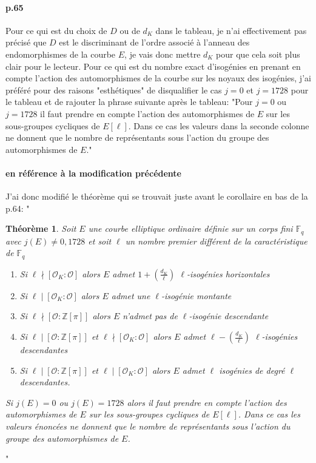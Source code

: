 \documentclass[10pt,a4paper]{article}
\theoremstyle{plain}
\newtheorem{thm}{Théorème}[section]
\theoremstyle{definition}
\theoremstyle{definition}
\theoremstyle{definition}
\theoremstyle{definition}
\theoremstyle{definition}
\theoremstyle{remark}
\theoremstyle{remark}
\theoremstyle{definition}
\begin{document}
\paragraph{p.65}{Pour ce qui est du choix de $D$ ou de $d_{K}$ dans le tableau,
je n'ai effectivement pas précisé que $D$ est le discriminant de l'ordre 
associé à l'anneau des endomorphismes de la courbe $E$, je vais donc mettre 
$d_K$ pour que cela soit plus clair pour le lecteur. Pour ce qui est du nombre 
exact d'isogénies en prenant en compte l'action des automorphismes de la 
courbe sur les noyaux des isogénies, j'ai préféré pour des raisons 
"esthétiques" de disqualifier le cas $j=0$ et $j=1728$ pour le tableau et de 
rajouter la phrase suivante après le tableau: "Pour $j=0$ ou $j=1728$ il faut 
prendre en compte l'action des automorphismes de
$E$ sur les sous-groupes cycliques de $E[\ell]$. Dans ce cas
 les valeurs dans la seconde colonne ne donnent que le nombre 
de représentants sous l'action du groupe des automorphismes de $E$."}

\paragraph{ en référence à la modification précédente}{J'ai donc modifié le théorème qui se trouvait juste avant le corollaire en bas de la p.64: "\begin{thm}
\label{thm:Koh:cas}
Soit $E$ une courbe elliptique ordinaire définie sur un corps fini 
$\mathbb{F}_q$ avec $j(E)\neq 0, 1728$ et soit $\ell$ un nombre premier 
différent de la caractéristique de $\mathbb{F}_q$
\begin{enumerate}
\item Si $\ell \nmid [\mathcal{O}_K : \mathcal{O}]$ alors $E$ admet $ 1 + \left( \frac{d_K}{\ell} \right)$ $\ell$-isogénies horizontales
\item Si $\ell \mid [\mathcal{O}_K : \mathcal{O}]$ alors $E$ admet une $\ell$-isogénie montante
\item Si $\ell \nmid [\mathcal{O} : \mathbb{Z}[\pi]]$ alors $E$ n'admet pas de $\ell$-isogénie descendante
\item Si $\ell \mid [\mathcal{O} : \mathbb{Z}[\pi]]$ et $\ell \nmid [\mathcal{O}_K : \mathcal{O}]$ alors $E$ admet $\ell-\left( \frac{d_K}{\ell} \right)$ $\ell$-isogénies descendantes
\item  Si $\ell \mid [\mathcal{O} : \mathbb{Z}[\pi]]$ et $\ell \mid [\mathcal{O}_K : \mathcal{O}]$ alors $E$ admet $\ell$ isogénies de degré $\ell$ descendantes.
\end{enumerate}
Si $j(E)=0$ ou $j(E)=1728$ alors il faut prendre en compte l'action des 
automorphismes de $E$ sur les sous-groupes cycliques de $E[\ell]$. Dans ce cas
les valeurs énoncées ne donnent que le nombre de représentants 
sous l'action du groupe des automorphismes de $E$.
\end{thm}"}
\end{document}
